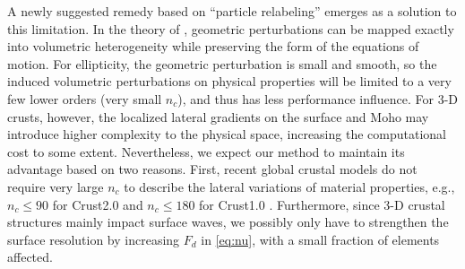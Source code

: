 \documentclass[extra,referee]{gji}
\begin{document}
A newly suggested remedy based on ``particle relabeling'' 
\cite[]{attar2016particle} emerges as a solution to this limitation.
In the theory of \cite{attar2016particle}, geometric perturbations can be mapped exactly into 
volumetric heterogeneity while preserving the form of the equations of motion. 
For ellipticity, the geometric perturbation is small and smooth, 
so the induced volumetric perturbations on physical properties will be
limited to a very few lower orders (very small $n_c$), and thus has less
performance influence. For 3-D crusts, however, the localized
lateral gradients on the surface and Moho may introduce higher complexity
to the physical space, increasing the computational cost to some extent. 
Nevertheless, we expect our method to maintain its advantage based on two reasons. 
First, recent global crustal models do not require very large $n_c$ to describe 
the lateral variations of material properties,
e.g., $n_c\le90$ for Crust2.0 \cite[]{bassin2000current} and
$n_c\le180$ for Crust1.0 \cite[]{laske2013update}. 
Furthermore, since 3-D crustal structures mainly impact surface waves, 
we possibly only have to strengthen the surface resolution by increasing $F_d$ 
in \eqref{eq:nu}, with a small fraction of elements affected.
\end{document}
